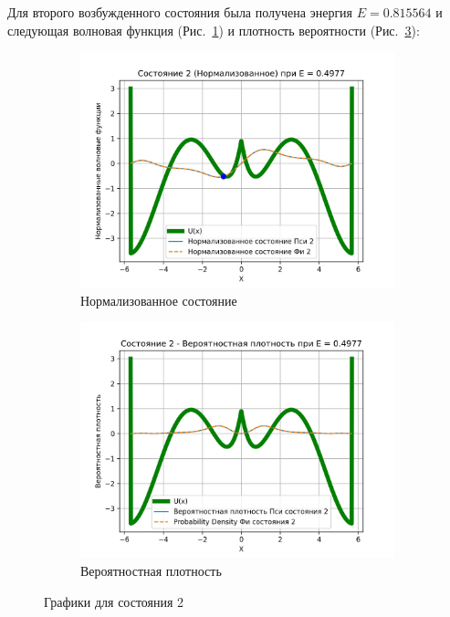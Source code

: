 \documentclass[a4paper,12pt]{article}
\begin{document}
Для второго возбужденного состояния была получена энергия $E = 0.815564$ и следующая волновая функция (Рис.~\ref{fig:norm2}) и плотность вероятности (Рис.~\ref{fig:probDens2}):

\begin{figure}[H]
    \centering
    \begin{subfigure}{0.45\textwidth}
        \centering
        \includegraphics[width=0.9\linewidth]{Condition_2_(normalized)}
        \caption{Нормализованное состояние}
        \label{fig:norm2}
    \end{subfigure}%
    \begin{subfigure}{0.45\textwidth}
        \centering
        \includegraphics[width=0.9\linewidth]{Condition_2_(Probability_density)}
        \caption{Вероятностная плотность}
        \label{fig:probDens2}
    \end{subfigure}%
\caption{Графики для состояния 2}
\end{figure}
\label{fig:cond2}
\end{document}
